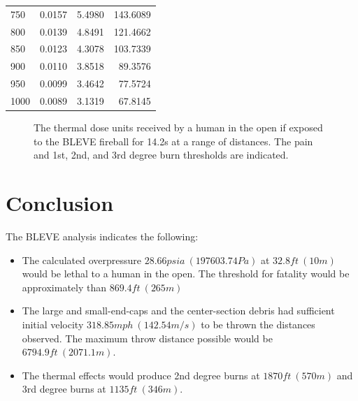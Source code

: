 \documentclass[10pt,parskip=half,
toc=sectionentrywithdots,
bibliography=totocnumbered,
captions=tableheading,numbers=noendperiod]{scrartcl}
\providecommand{\tightlist}{%
  \setlength{\itemsep}{0pt}\setlength{\parskip}{0pt}}
\begin{document}
\begin{table}[H]
\begin{adjustbox}{max width=\textwidth}
\begin{tabular}{lrrr}
750                 &       0.0157 &                             5.4980 &                                143.6089 \\
800                 &       0.0139 &                             4.8491 &                                121.4662 \\
850                 &       0.0123 &                             4.3078 &                                103.7339 \\
900                 &       0.0110 &                             3.8518 &                                 89.3576 \\
950                 &       0.0099 &                             3.4642 &                                 77.5724 \\
1000                &       0.0089 &                             3.1319 &                                 67.8145 \\
\bottomrule
\end{tabular}

\end{adjustbox}
\end{table}

\begin{figure}[H]\begin{center}\end{center}\caption{The thermal dose units received by a human in the open if exposed to the
BLEVE fireball for 14.2s at a range of distances. The pain and 1st, 2nd,
and 3rd degree burn thresholds are indicated.}\label{fig:fig_tdu}\end{figure}

\hypertarget{conclusion}{%
\section{Conclusion}\label{conclusion}}

The BLEVE analysis indicates the following:

\begin{itemize}
\tightlist
\item
  The calculated overpressure \(28.66psia\:(197603.74Pa)\) at
  \(32.8ft\:(10m)\) would be lethal to a human in the open. The
  threshold for fatality would be approximately than \(869.4ft\:(265m)\)
\item
  The large and small-end-caps and the center-section debris had
  sufficient initial velocity \(318.85mph\:(142.54m/s)\) to be thrown
  the distances observed. The maximum throw distance possible would be
  \(6794.9ft\:(2071.1m)\).
\item
  The thermal effects would produce 2nd degree burns at
  \(1870ft\:(570m)\) and 3rd degree burns at \(1135ft\:(346m)\).
\end{itemize}
\end{document}
